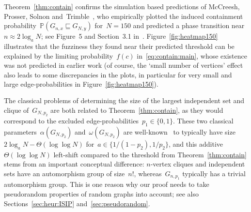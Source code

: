 \documentclass{article}
\renewcommand{\Pr}{\mathbb{P}}
\newcommand{\isub}{\sqsubseteq}
\begin{document}
Theorem~\ref{thm:contain} confirms the simulation based predictions of McCreesh, Prosser, Solnon and~Trimble~\mbox{\cite{mccreesh2016subgraph,mccreesh2018subgraph}}, 
who empirically plotted the induced containment probability~$\Pr(G_{n,x}\isub G_{N,y})$ for~$N=150$ and predicted a phase transition near~${n \approx 2\log_a N}$; see Figure~5 and Section~3.1 in~\cite{mccreesh2018subgraph}.  
Figure~\ref{fig:heatmap150} illustrates that the fuzziness they found near their predicted threshold can be explained by the limiting probability~$f(c)$ in~\eqref{eq:contain:main}, 
whose existence was not predicted in earlier work 
(of course, the `small number of vertices' effect also leads to some discrepancies in the plots, in particular for very small and large edge-probabilities in Figure~\ref{fig:heatmap150}). 


The classical problems of determining the size of the largest independent set and clique of~$G_{N,p_2}$ are both related to Theorem~\ref{thm:contain}, 
as they would correspond to the excluded edge-probabilities~${p_1 \in \{0,1\}}$.
These two classical parameters~$\alpha(G_{N,p_2})$ and~$\omega(G_{N,p_2})$ are well-known~\cite{BB,JLR} to typically have size~${2 \log_{a}N - \Theta(\log \log N)}$ for~$a \in \{1/(1-p_2),1/p_2\}$, 
and this additive~$\Theta(\log \log N)$ left-shift compared to the threshold from Theorem~\ref{thm:contain} 
stems from an important conceptual difference: 
$n$-vertex cliques and independent sets have an automorphism group of size~$n!$, 
whereas~$G_{n,p_1}$ typically has a trivial automorphism group. 
This is one reason why our proof needs to take pseudorandom properties of random graphs into account; see also Sections~\ref{sec:heur:ISIP} and~\ref{sec:pseudorandom}. 
\end{document}
